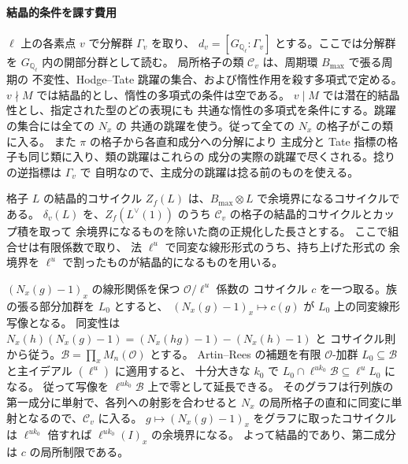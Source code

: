 \paragraph{結晶的条件を課す費用}
\(\ell\) 上の各素点 \(v\) で分解群 \(\Gamma_v\) を取り、
\(d_v=[G_{\mathbb Q_\ell}:\Gamma_v]\) とする。ここでは分解群を
\(G_{\mathbb Q_\ell}\) 内の開部分群として読む。
局所格子の類 \(\mathcal C_v\) は、周期環 \(B_{\max}\) で張る周期の
不変性、Hodge--Tate 跳躍の集合、および惰性作用を殺す多項式で定める。
\(v\nmid M\) では結晶的とし、惰性の多項式の条件は空である。
\(v\mid M\) では潜在的結晶性とし、指定された型のどの表現にも
共通な惰性の多項式を条件にする。跳躍の集合には全ての \(N_x\) の
共通の跳躍を使う。従って全ての \(N_x\) の格子がこの類に入る。
また \(\pi\) の格子から各直和成分への分解により
主成分と Tate 指標の格子も同じ類に入り、類の跳躍はこれらの
成分の実際の跳躍で尽くされる。捻りの逆指標は \(\Gamma_v\) で
自明なので、主成分の跳躍は捻る前のものを使える。

格子 \(L\) の結晶的コサイクル \(Z_f(L)\) は、\(B_{\max}\otimes L\)
で余境界になるコサイクルである。
\(\delta_v(L)\) を、\(Z_f(L^\vee(1))\) のうち
\(\mathcal C_v\) の格子の結晶的コサイクルとカップ積を取って
余境界になるものを除いた商の正規化した長さとする。
ここで組合せは有限係数で取り、
法 \(\ell^u\) で同変な線形形式のうち、持ち上げた形式の
余境界を \(\ell^u\) で割ったものが結晶的になるものを用いる。

\((N_x(g)-1)_x\) の線形関係を保つ \(\mathcal O/\ell^u\) 係数の
コサイクル \(c\) を一つ取る。族の張る部分加群を \(L_0\) とすると、
\((N_x(g)-1)_x\mapsto c(g)\) が \(L_0\) 上の同変線形写像となる。
同変性は \(N_x(h)(N_x(g)-1)=(N_x(hg)-1)-(N_x(h)-1)\) と
コサイクル則から従う。\(\mathcal B=\prod_x M_n(\mathcal O)\) とする。
Artin--Rees の補題を有限 \(\mathcal O\)-加群
\(L_0\subseteq\mathcal B\) と主イデアル \((\ell^u)\) に適用すると、
十分大きな \(k_0\) で
\(L_0\cap\ell^{u k_0}\mathcal B\subseteq \ell^u L_0\) になる。
従って写像を \(\ell^{u k_0}\mathcal B\) 上で零として延長できる。
そのグラフは行列族の第一成分に単射で、各列への射影を合わせると
\(N_x\) の局所格子の直和に同変に単射となるので、\(\mathcal C_v\) に入る。
\(g\mapsto (N_x(g)-1)_x\) をグラフに取ったコサイクルは
\(\ell^{u k_0}\) 倍すれば \(\ell^{u k_0}(I)_x\) の余境界になる。
よって結晶的であり、第二成分は \(c\) の局所制限である。

